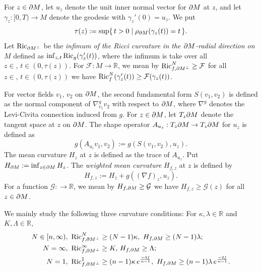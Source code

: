 For $z\in \partial M$,
let $u_{z}$ denote the unit inner normal vector for $\partial M$ at $z$,
and let $\gamma_{z}:[0,T)\to M$ denote the geodesic with $\gamma_{z}'(0)=u_{z}$.
We put
\begin{equation*}
\tau(z):=\sup \{\,t>0 \mid \rho_{\partial M}(\gamma_{z}(t))=t\,\}.
\end{equation*}
Let $\operatorname{Ric}_{\partial M^{\perp}}$ be the \textit{infimum of the Ricci curvature in the $\partial M$-radial direction on $M$} defined as $\inf_{z,t} \operatorname{Ric}_{g}(\gamma'_{z}(t))$,
where the infimum is take over all $z\in \bm,\,t \in (0,\tau(z))$.
For $\mathcal{F}:M\to \mathbb{R}$,
we mean by $\operatorname{Ric}^{N}_{f,\partial M^{\perp}} \geq \mathcal{F}$ for all $z \in \bm,\,t \in (0,\tau(z))$
we have $\operatorname{Ric}^{N}_{f}(\gamma'_{z}(t))\geq \mathcal{F}(\gamma_{z}(t))$.

For vector fields $v_{1},\,v_{2}$ on $\partial M$,
the second fundamental form $S(v_{1},v_{2})$ is defined as the normal component of $\nabla^{g}_{v_{1}}v_{2}$ with respect to $\partial M$,
where $\nabla^{g}$ denotes the Levi-Civita connection induced from $g$.
For $z\in \partial M$,
let $T_{z}\partial M$ denote the tangent space at $z$ on $\partial M$.
The shape operator $A_{u_{z}}:T_{z}\partial M \to T_{z}\partial M$ for $u_{z}$ is defined as
\begin{equation*}
g(A_{u_{z}}v_{1},v_{2}):=g(S(v_{1},v_{2}),u_{z}).
\end{equation*}
The mean curvature $H_{z}$ at $z$ is defined as the trace of $A_{u_{z}}$.
Put $H_{\partial M}:=\inf_{z\in \partial M} H_{z}$.
The \textit{weighted mean curvature} $H_{f,z}$ at $z$ is defined by
\begin{equation*}
H_{f,z}:=H_{z}+g((\nabla f)_{z},u_{z}).
\end{equation*}
For a function $\mathcal{G}:\bm\to \mathbb{R}$,
we mean by $H_{f,\partial M}\geq \mathcal{G}$
we have $H_{f,z} \geq \mathcal{G}(z)$ for all $z\in \partial M$.

We mainly study the following three curvature conditions:
For $\kappa,\lambda \in \mathbb{R}$ and $K,\Lambda \in \mathbb{R}$,
\begin{align}\label{eq:finite dimensional curvature bound}
N \in [n,\infty),\,\, &\operatorname{Ric}^{N}_{f,\partial M^{\perp}}\geq (N-1)\kappa,\,\, H_{f,\partial M}\geq (N-1)\lambda;\\ \label{eq:infinite dimensional curvature bound}
N=\infty,\,\,&\operatorname{Ric}^{\infty}_{f,\partial M^{\perp}}\geq K,\, H_{f,\partial M}\geq \Lambda; \\ \label{eq:one dimensional curvature bound}
N=1,\,\,&\operatorname{Ric}^{1}_{f,\partial M^{\perp}}\geq (n-1)\kappa\, e^{\frac{-4f}{n-1}},\,\, H_{f,\partial M}\geq (n-1)\lambda\, e^{\frac{-2f}{n-1}}.
\end{align}

